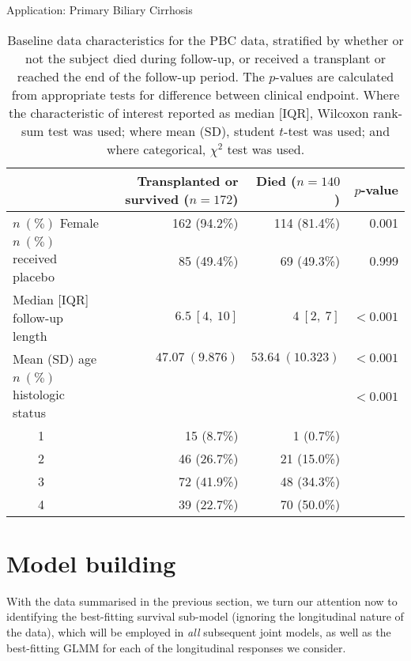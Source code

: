 \begin{chapter}{\label{cha:app-PBC}Application: Primary Biliary Cirrhosis}
  \begin{table}[h]
      \centering
      \captionsetup{font=scriptsize}
      \begingroup\scriptsize
      \begin{tabular}{l|rrr}
           & Transplanted or survived ($n=172$) & Died ($n=140$) & $p$-value\\ \hline
           $n\ (\%)$ Female & 162 (94.2\%) & 114 (81.4\%)& 0.001 \\
           $n\ (\%)$ received placebo & 85 (49.4\%) & 69 (49.3\%) & 0.999\\
           Median [IQR] follow-up length & $6.5\ [4,\ 10]$ & $4\ [2,\ 7]$ & $<0.001$ \\
           Mean (SD) age & $47.07\ (9.876)$ & $53.64\ (10.323)$ & $<0.001$ \\
           $n\ (\%)$ histologic status & & & $<0.001$\\
           $\qquad$1 & 15 (8.7\%) & 1 (0.7\%) & \\
           $\qquad$2 & 46 (26.7\%) & 21 (15.0\%) & \\
           $\qquad$3 & 72 (41.9\%) & 48 (34.3\%) & \\
           $\qquad$4 & 39 (22.7\%) & 70 (50.0\%) & \\
           \hline
      \end{tabular}
      \endgroup
      \caption{Baseline data characteristics for the PBC data, stratified by whether or not the subject died during follow-up, or received a transplant or reached the end of the follow-up period. The $p$-values are calculated from appropriate tests for difference between clinical endpoint. Where the characteristic of interest reported as median [IQR], Wilcoxon rank-sum test was used; where mean (SD), student $t$-test was used; and where categorical, $\chi^2$ test was used.}
      \label{tab:pbc-data-characteristics}
  \end{table}

  \section{Model building}\label{sec:pbc-modelbuilding-parent}
  With the data summarised in the previous section, we turn our attention now to identifying the best-fitting survival sub-model (\ie ignoring the longitudinal nature of the data), which will be employed in \textit{all} subsequent joint models, as well as the best-fitting GLMM for each of the longitudinal responses we consider.

\end{chapter}
